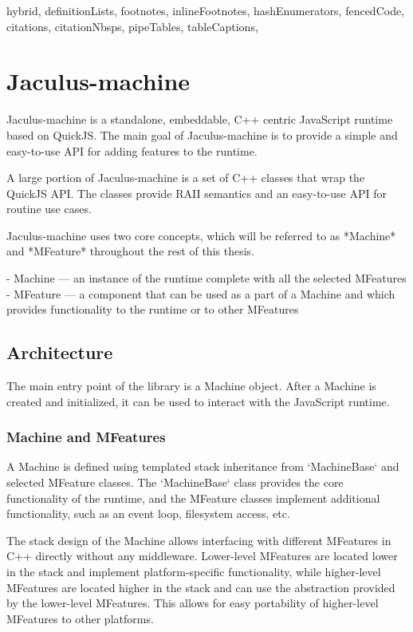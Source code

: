 \begin{markdown*}{%
  hybrid,
  definitionLists,
  footnotes,
  inlineFootnotes,
  hashEnumerators,
  fencedCode,
  citations,
  citationNbsps,
  pipeTables,
  tableCaptions,
}

\chapter{Jaculus-machine}

Jaculus-machine is a standalone, embeddable, C++ centric JavaScript runtime based on QuickJS. The main goal of Jaculus-machine is to provide a simple and easy-to-use API for adding features to the runtime.

A large portion of Jaculus-machine is a set of C++ classes that wrap the QuickJS API. The classes provide RAII semantics and an easy-to-use API for routine use cases.

Jaculus-machine uses two core concepts, which will be referred to as *Machine* and *MFeature* throughout the rest of this thesis.

  - Machine --- an instance of the runtime complete with all the selected MFeatures
  - MFeature --- a component that can be used as a part of a Machine and which provides functionality to the runtime or to other MFeatures

\section{Architecture}

The main entry point of the library is a Machine object. After a Machine is created and initialized, it can be used to interact with the JavaScript runtime.

\subsection{Machine and MFeatures}

A Machine is defined using templated stack inheritance from `MachineBase` and selected MFeature classes. The `MachineBase` class provides the core functionality of the runtime, and the MFeature classes implement additional functionality, such as an event loop, filesystem access, etc.

The stack design of the Machine allows interfacing with different MFeatures in C++ directly without any middleware. Lower-level MFeatures are located lower in the stack and implement platform-specific functionality, while higher-level MFeatures are located higher in the stack and can use the abstraction provided by the lower-level MFeatures. This allows for easy portability of higher-level MFeatures to other platforms.


\end{markdown*}
